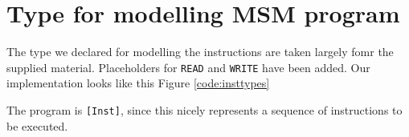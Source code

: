 \section{Type for modelling MSM program}

The type we declared for modelling the instructions are taken largely fomr the
supplied material. Placeholders for \texttt{READ} and \texttt{WRITE} have been
added. Our implementation looks like this Figure \ref{code:insttypes}

The program is \texttt{[Inst]}, since this nicely represents a sequence of
instructions to be executed.

